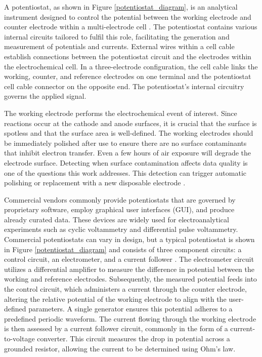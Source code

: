 A potentiostat, as shown in Figure \ref{potentiostat_diagram}, is an analytical instrument designed to control the potential between the working electrode and counter electrode within a multi-electrode cell \cite{Zoski2006-zx}. The potentiostat contains various internal circuits tailored to fulfil this role, facilitating the generation and measurement of potentials and currents. External wires within a cell cable establish connections between the potentiostat circuit and the electrodes within the electrochemical cell. In a three-electrode configuration, the cell cable links the working, counter, and reference electrodes on one terminal and the potentiostat cell cable connector on the opposite end. The potentiostat's internal circuitry governs the applied signal. 

The working electrode performs the electrochemical event of interest. Since reactions occur at the cathode and anode surfaces, it is crucial that the surface is spotless and that the surface area is well-defined. The working electrodes should be immediately polished after use to ensure there are no surface contaminants that inhibit electron transfer. Even a few hours of air exposure will degrade the electrode surface. Detecting when surface contamination affects data quality is one of the questions this work addresses. This detection can trigger automatic polishing or replacement with a new disposable electrode \cite{Yoshikawa2024}.

Commercial vendors commonly provide potentiostats that are governed by proprietary software, employ graphical user interfaces (GUI), and produce already curated data. These devices are widely used for electroanalytical experiments such as cyclic voltammetry and differential pulse voltammetry. Commercial potentiostats can vary in design, but a typical potentiostat is shown in Figure \ref{potentiostat_diagram} and consists of three component circuits: a control circuit, an electrometer, and a current follower \cite{WAIN20211}. The electrometer circuit utilizes a differential amplifier to measure the difference in potential between the working and reference electrodes. Subsequently, the measured potential feeds into the control circuit, which administers a current through the counter electrode, altering the relative potential of the working electrode to align with the user-defined parameters. A single generator ensures this potential adheres to a predefined periodic waveform. The current flowing through the working electrode is then assessed by a current follower circuit, commonly in the form of a current-to-voltage converter. This circuit measures the drop in potential across a grounded resistor, allowing the current to be determined using Ohm's law.

